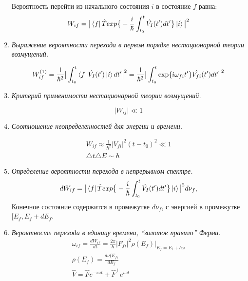 \documentclass{article}
\begin{document}
\begin{enumerate}
	Вероятность перейти из начального состояния $i$ в состояние $f$ равна:
	\begin{equation}
		W_{if}=\big|\bra{f}\hat{T}exp\big\{-\frac{i}{\hbar}\int_{t_{0}}^{t}\hat{V_{I}}(t')dt'\big\}\ket{i}\big|^{2}
	\end{equation}
	
	\item \textit{Выражение вероятности перехода в первом порядке нестационарной теории возмущений.}
	
	\begin{equation}
		W_{if}^{(1)}=\frac{1}{\hbar^{2}}\big|\int_{t_{0}}^{t}\bra{f}\hat{V_{I}}(t')\ket{i}dt'\big|^{2}=\frac{1}{\hbar^{2}}\big|\int_{t_{0}}^{t}\exp\{i\omega_{fi}t'\}\hat{V_{fi}}(t')dt'\big|^{2}
	\end{equation}
	
	\item \textit{Критерий применимости нестационарной теории возмущений.}
	
	\begin{equation}
		|W_{if}|\ll1
	\end{equation}
	
	\item \textit{Соотношение неопределенностей для энергии и времени.}
	
	\begin{gather}
		W_{if}\approx\frac{1}{\hbar^{2}}|V_{fi}|^{2}(t-t_{0})^{2}\ll1 \\
		\triangle t\triangle E\sim\hbar
	\end{gather}
	
	\item \textit{Определение вероятности перехода в непрерывном спектре.}
	\begin{equation}
		dW_{if}=\big|\bra{f}\hat{T}exp\big\{-\frac{i}{\hbar}\int_{t_{0}}^{t}\hat{V_{I}}(t')dt'\big\}\ket{i}\big|^{2}d\nu_{f},
	\end{equation}
	Конечное состояние содержится в промежутке $d\nu_f$, с энергией в промежутке $[E_f, E_f + dE_f$.
	
	\item \textit{Вероятность перехода в единицу времени, “золотое правило” Ферми.}
	\begin{gather}
		\omega_{if}=\frac{dW_{if}}{dt}=\frac{2\pi}{\hbar}\big|F_{fi}\big|^{2}\rho(E_{f})\big|_{E_{f}=E_{i}+\hbar\omega} \\
		\rho(E_{f})=\frac{d\nu(E_{f)}}{dE_{f}} \\
		\hat{V}=\hat{F}e^{-i\omega t}+\hat{F}^{+}e^{i\omega t}
	\end{gather}
	

\end{enumerate}
\end{document}
